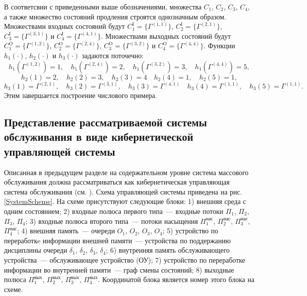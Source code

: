 \documentclass[a4paper,12pt,russian]{extarticle}
\newcommand{\ga}[1]{\Gamma^{\left( #1 \right)} }
\begin{document}
В соответсвии с приведенными выше обозначениями, множества $C_1$, $C_2$, $C_3$, $C_4$, а также множество состояний продления строятся однозначным образом. Множествами входных состояний будут $C_1^{\mathrm{I}}=\{\ga{1,1}\}$, $C_2^{\mathrm{I}}=\{\ga{2,1}\}$, $C_3^{\mathrm{I}}=\{\ga{3,1}\}$ и $C_4^{\mathrm{I}}=\{\ga{4,1}\}$. Множествами выходных состояний будут $C_1^{\mathrm{O}}=\{\ga{1,2}\}$, $C_2^{\mathrm{O}}=\{\ga{2,4}\}$, $C_3^{\mathrm{O}}=\{\ga{3,2}\}$ и $C_4^{\mathrm{O}}=\{\ga{4,4}\}$. Функции $h_1(\cdot)$, $h_2(\cdot)$ и $h_3(\cdot)$ задаются поточечно:
\begin{equation*}
h_1(\ga{1,2})=1, \quad h_1(\ga{2,4})=2, \quad h_1(\ga{3,2})=3, \quad h_1(\ga{4,4})=5,
\end{equation*}
\begin{equation*}
h_2(1)=2, \quad h_2(2)=3, \quad h_2(3)=4 \quad h_2(4)=1, \quad h_2(5)=1,
\end{equation*}
\begin{equation*}
h_3(1)=\ga{2,1}, \quad h_3(2)=\ga{3,1}, \quad h_3(3)=\ga{4,1} \quad h_3(4)=\ga{1,1}, \quad h_3(5)=\ga{1,1}.
\end{equation*}
Этим завершается построение числового примера.

\subsection{Представление рассматриваемой системы обслуживания в виде кибернетической управляющей системы}
Описанная в предыдущем разделе на содержательном уровне система массового обслуживания должна рассматриваться как кибернетическая управляющая система обслуживания (см. \cite{Zorine:2011}). Схема управляющей системы приведена на рис. \ref{SystemScheme}. На схеме присутствуют следующие блоки: 1) внешняя среда с одним состоянием; 2) входные полюса первого типа~--- входные потоки $\Pi_1$, $\Pi_2$, $\Pi_3$, $\Pi_4$; 3) входные полюса второго типа~--- потоки насыщения $\Pi_1^{\mathrm{\text{нас}}}$, $\Pi_2^{\mathrm{\text{нас}}}$, $\Pi_3^{\mathrm{\text{нас}}}$, $\Pi_4^{\mathrm{\text{нас}}}$; 4) внешняя память~--- очереди $O_1$, $O_2$, $O_3$, $O_4$; 5) устройство по переработкe информации внешней памяти~--- устройства по поддержанию дисциплины очереди $\delta_1$, $\delta_2$, $\delta_3$, $\delta_4$; 6) внутренняя память обслуживающего устройства~--- обслуживающее устройство (ОУ); 7) устройство по переработке информации во внутренней памяти~--- граф смены состояний; 8) выходные полюса $\Pi_1^{\mathrm{\text{вых}}}$, $\Pi_2^{\mathrm{\text{вых}}}$, $\Pi_3^{\mathrm{\text{вых}}}$, $\Pi_4^{\mathrm{\text{вых}}}$. Координатой блока является номер этого блока на схеме. 
\end{document}

